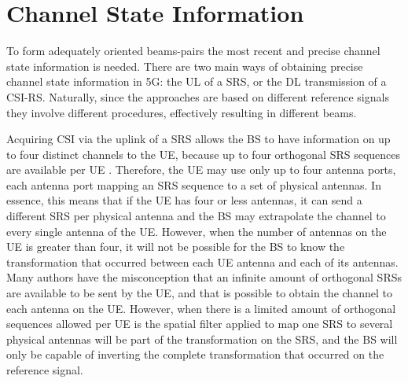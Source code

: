 \section{Channel State Information}
\label{sec:CSI}






To form adequately oriented beams-pairs the most recent and precise channel state information is needed. There are two main ways of obtaining precise channel state information in 5G: the UL of a SRS, or the DL transmission of a CSI-RS. Naturally, since the approaches are based on different reference signals they involve different procedures, effectively resulting in different beams.




Acquiring CSI via the uplink of a \ac{SRS} allows the BS to have information on up to four distinct channels to the UE, because up to four orthogonal SRS sequences are available per UE \cite{DAHLMAN2018}. Therefore, the UE may use only up to four antenna ports, each antenna port mapping an SRS sequence to a set of physical antennas. In essence, this means that if the UE has four or less antennas, it can send a different SRS per physical antenna and the BS may extrapolate the channel to every single antenna of the UE. However, when the number of antennas on the UE is greater than four, it will not be possible for the BS to know the transformation that occurred between each UE antenna and each of its antennas. Many authors \cite{7504159}  have the misconception that an infinite amount of orthogonal SRSs are available to be sent by the UE, and that is possible to obtain the channel to each antenna on the UE. However, when there is a limited amount of orthogonal sequences allowed per UE is the spatial filter applied to map one SRS to several physical antennas will be part of the transformation on the SRS, and the BS will only be capable of inverting the complete transformation that occurred on the reference signal. 

